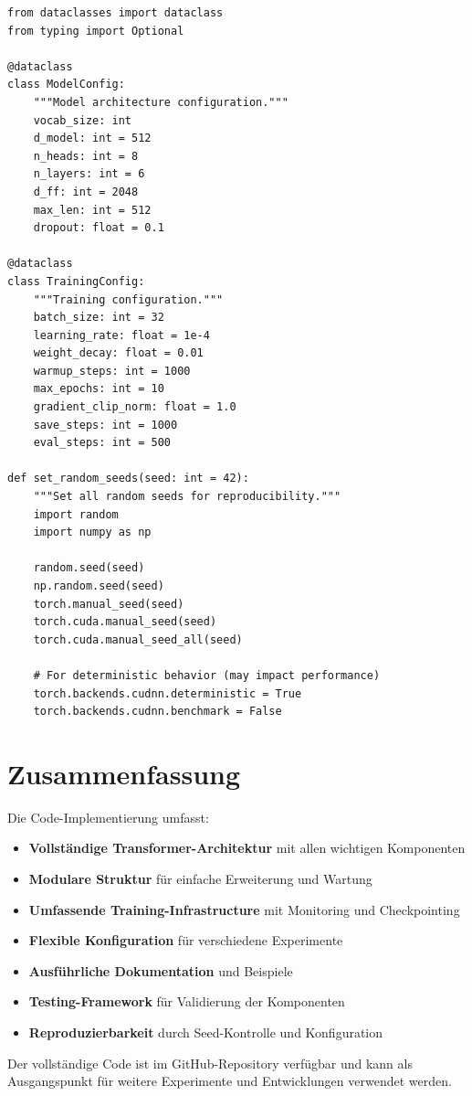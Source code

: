 \begin{lstlisting}[style=pythonstyle, caption=Configuration Management]
from dataclasses import dataclass
from typing import Optional

@dataclass
class ModelConfig:
    """Model architecture configuration."""
    vocab_size: int
    d_model: int = 512
    n_heads: int = 8
    n_layers: int = 6
    d_ff: int = 2048
    max_len: int = 512
    dropout: float = 0.1

@dataclass
class TrainingConfig:
    """Training configuration."""
    batch_size: int = 32
    learning_rate: float = 1e-4
    weight_decay: float = 0.01
    warmup_steps: int = 1000
    max_epochs: int = 10
    gradient_clip_norm: float = 1.0
    save_steps: int = 1000
    eval_steps: int = 500

def set_random_seeds(seed: int = 42):
    """Set all random seeds for reproducibility."""
    import random
    import numpy as np
    
    random.seed(seed)
    np.random.seed(seed)
    torch.manual_seed(seed)
    torch.cuda.manual_seed(seed)
    torch.cuda.manual_seed_all(seed)
    
    # For deterministic behavior (may impact performance)
    torch.backends.cudnn.deterministic = True
    torch.backends.cudnn.benchmark = False
\end{lstlisting}

\section{Zusammenfassung}

Die Code-Implementierung umfasst:

\begin{itemize}
    \item \textbf{Vollständige Transformer-Architektur} mit allen wichtigen Komponenten
    \item \textbf{Modulare Struktur} für einfache Erweiterung und Wartung
    \item \textbf{Umfassende Training-Infrastructure} mit Monitoring und Checkpointing
    \item \textbf{Flexible Konfiguration} für verschiedene Experimente
    \item \textbf{Ausführliche Dokumentation} und Beispiele
    \item \textbf{Testing-Framework} für Validierung der Komponenten
    \item \textbf{Reproduzierbarkeit} durch Seed-Kontrolle und Konfiguration
\end{itemize}

Der vollständige Code ist im GitHub-Repository verfügbar und kann als Ausgangspunkt für weitere Experimente und Entwicklungen verwendet werden.